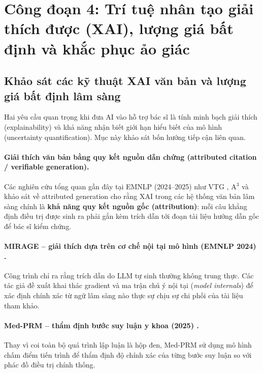 \section{Công đoạn 4: Trí tuệ nhân tạo giải thích được (XAI), lượng giá bất định và khắc phục ảo giác}

\subsection{Khảo sát các kỹ thuật XAI văn bản và lượng giá bất định lâm sàng}
Hai yêu cầu quan trọng khi đưa AI vào hỗ trợ bác sĩ là tính minh bạch giải thích (explainability) và khả năng nhận biết giới hạn hiểu biết của mô hình (uncertainty quantification). Mục này khảo sát bốn hướng tiếp cận liên quan.

\paragraph{Giải thích văn bản bằng quy kết nguồn dẫn chứng (attributed citation / verifiable generation).}
Các nghiên cứu tổng quan gần đây tại EMNLP (2024--2025) như VTG \cite{sun2024vtg}, A$^3$ \cite{alignment_attributed_2024} và khảo sát về attributed generation \cite{attribution_survey_2025} cho rằng XAI trong các hệ thống văn bản lâm sàng chính là \textbf{khả năng quy kết nguồn gốc (attribution)}: mỗi câu khẳng định điều trị được sinh ra phải gắn kèm trích dẫn tới đoạn tài liệu hướng dẫn gốc để bác sĩ kiểm chứng.

\paragraph{MIRAGE -- giải thích dựa trên cơ chế nội tại mô hình (EMNLP 2024) \cite{qi2024mirage}.}
Công trình chỉ ra rằng trích dẫn do LLM tự sinh thường không trung thực. Các tác giả đề xuất khai thác gradient và ma trận chú ý nội tại (\emph{model internals}) để xác định chính xác từ ngữ lâm sàng nào thực sự chịu sự chi phối của tài liệu tham khảo.

\paragraph{Med-PRM -- thẩm định bước suy luận y khoa (2025) \cite{medprm2024}.}
Thay vì coi toàn bộ quá trình lập luận là hộp đen, Med-PRM sử dụng mô hình chấm điểm tiến trình để thẩm định độ chính xác của từng bước suy luận so với phác đồ điều trị chính thống.

